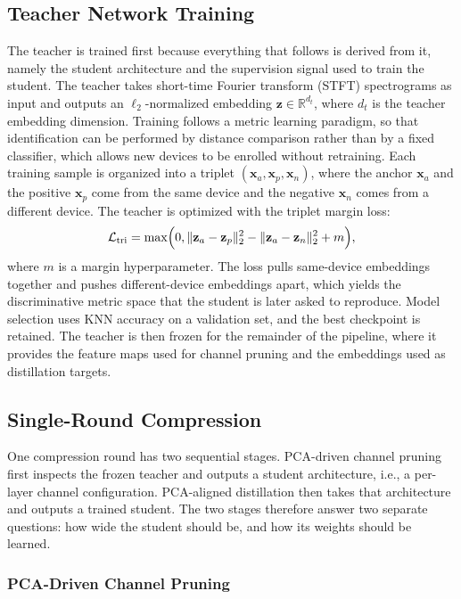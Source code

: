 \documentclass[journal,comsoc]{IEEEtran}
\begin{document}
\subsection{Teacher Network Training}
The teacher is trained first because everything that follows is derived from it, namely the student architecture and the supervision signal used to train the student. The teacher takes short-time Fourier transform (STFT) spectrograms as input and outputs an $\ell_2$-normalized embedding $\mathbf{z} \in \mathbb{R}^{d_t}$, where $d_t$ is the teacher embedding dimension. Training follows a metric learning paradigm, so that identification can be performed by distance comparison rather than by a fixed classifier, which allows new devices to be enrolled without retraining. Each training sample is organized into a triplet $(\mathbf{x}_a, \mathbf{x}_p, \mathbf{x}_n)$, where the anchor $\mathbf{x}_a$ and the positive $\mathbf{x}_p$ come from the same device and the negative $\mathbf{x}_n$ comes from a different device. The teacher is optimized with the triplet margin loss:
\begin{equation}
\label{eq:triplet}
\mathcal{L}_{\text{tri}} =
\max\Bigl(0,
\lVert \mathbf{z}_{a} - \mathbf{z}_{p} \rVert_2^2 -
\lVert \mathbf{z}_{a} - \mathbf{z}_{n} \rVert_2^2 + m
\Bigr),
\end{equation}
where $m$ is a margin hyperparameter. The loss pulls same-device embeddings together and pushes different-device embeddings apart, which yields the discriminative metric space that the student is later asked to reproduce. Model selection uses KNN accuracy on a validation set, and the best checkpoint is retained. The teacher is then frozen for the remainder of the pipeline, where it provides the feature maps used for channel pruning and the embeddings used as distillation targets.

\subsection{Single-Round Compression}

One compression round has two sequential stages. PCA-driven channel pruning first inspects the frozen teacher and outputs a student architecture, i.e., a per-layer channel configuration. PCA-aligned distillation then takes that architecture and outputs a trained student. The two stages therefore answer two separate questions: how wide the student should be, and how its weights should be learned.

\subsubsection{PCA-Driven Channel Pruning}
\end{document}
